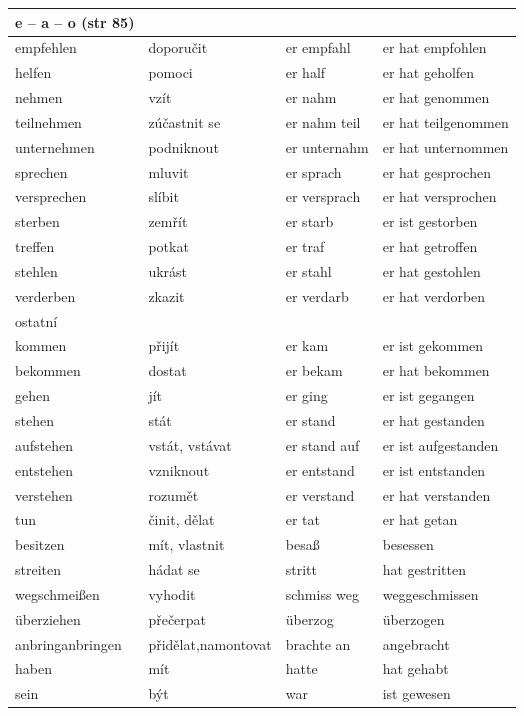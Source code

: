 \documentclass{article}
\begin{document}
\begin{tabular}{ p{3cm}|p{3cm}|p{3cm}|p{4cm}  }
    \hline
    e -- a -- o (str 85) \\
    \hline
    empfehlen & doporučit & er empfahl & er hat empfohlen \\
    helfen & pomoci & er half & er hat geholfen \\
    nehmen & vzít & er nahm & er hat genommen \\
    teilnehmen & zúčastnit se & er nahm teil & er hat teilgenommen \\
    unternehmen & podniknout & er unternahm & er hat unternommen \\
    sprechen & mluvit & er sprach & er hat gesprochen \\
    versprechen & slíbit & er versprach & er hat versprochen \\
    sterben & zemřít & er starb & er ist gestorben \\
    treffen & potkat & er traf & er hat getroffen \\
    stehlen & ukrást & er stahl & er hat gestohlen \\
    verderben & zkazit & er verdarb & er hat verdorben \\
    \hline
    ostatní \\
    \hline
    kommen & přijít & er kam & er ist gekommen \\
    bekommen & dostat & er bekam & er hat bekommen \\
    gehen & jít & er ging & er ist gegangen \\
    stehen & stát & er stand & er hat gestanden \\
    aufstehen & vstát, vstávat & er stand auf & er ist aufgestanden \\
    entstehen & vzniknout & er entstand & er ist entstanden \\
    verstehen & rozumět & er verstand & er hat verstanden \\
    tun & činit, dělat & er tat & er hat getan \\ 
    besitzen & mít, vlastnit & besa{\ss} & besessen \\
    streiten & hádat se & stritt & hat gestritten \\
    wegschmei{\ss}en & vyhodit & schmiss weg & weggeschmissen \\
    überziehen & přečerpat & überzog & überzogen \\
    anbringanbringen & přidělat,namontovat & brachte an & angebracht \\
    haben & mít & hatte & hat gehabt \\
    sein & být & war & ist gewesen \\
 \end{tabular}
\end{document}
